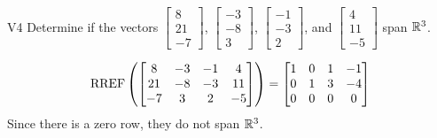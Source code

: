 \begin{problem}{V4}
Determine if the vectors  \(\begin{bmatrix} 8 \\ 21 \\ -7 \end{bmatrix}\), \(\begin{bmatrix} -3 \\ -8 \\ 3 \end{bmatrix}\), \(\begin{bmatrix} -1 \\ -3 \\ 2 \end{bmatrix}\), and \(\begin{bmatrix} 4 \\ 11 \\ -5 \end{bmatrix}\) span \(\mathbb{R}^3\).
\end{problem}
\begin{solution}
\[\operatorname{RREF}\left(\begin{bmatrix} 8 & -3 & -1 & 4 \\ 21 & -8 & -3 & 11 \\ -7 & 3 & 2 & -5  \end{bmatrix} \right) = \begin{bmatrix} 1 & 0 & 1 & -1 \\ 0 & 1 & 3 & -4 \\ 0 & 0 & 0 & 0\end{bmatrix}\]
Since there is a zero row, they do not span \(\mathbb{R}^3\).
\end{solution}

